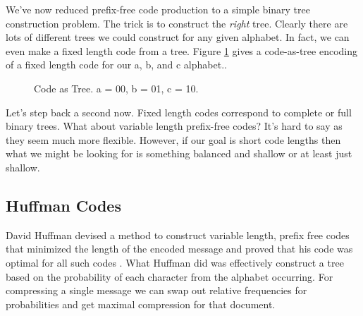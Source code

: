 \documentclass[]{tufte-handout}
\begin{document}
We've now reduced prefix-free code production to a simple binary tree construction problem.  The trick is to construct the \textit{right} tree. Clearly there are lots of different trees we could construct for any given alphabet. In fact, we can even make a fixed length code from a tree. Figure \ref{fig:abc-fix} gives a code-as-tree encoding of a fixed length code for our a, b, and c alphabet..

\begin{figure}[!htbp]
\caption{Code as Tree. a = 00, b = 01, c = 10.}
\label{fig:abc-fix}
\end{figure}

Let's step back a second now. Fixed length codes correspond to complete or full binary trees. What about variable length prefix-free codes? It's hard to say as they seem much more flexible. However, if our goal is short code lengths then what we might be looking for is something balanced and shallow or at least just shallow. 

\subsection{Huffman Codes}

David Huffman devised a method to construct variable length, prefix free codes that minimized the length of the encoded message and proved that his code was optimal for all such codes \cite{huff}. What Huffman did was effectively construct a tree based on the probability of each character from the alphabet occurring. For compressing a single message we can swap out relative frequencies for probabilities and get maximal compression for that document. 
\end{document}
